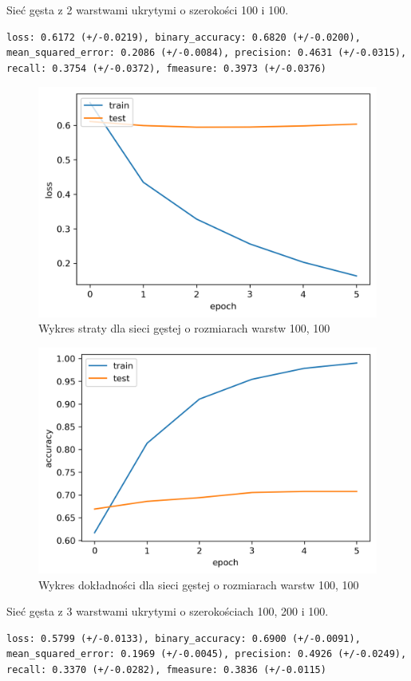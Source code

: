 \documentclass[polish,12pt]{aghthesis}
\begin{document}
Sieć gęsta z 2 warstwami ukrytymi o szerokości 100 i 100.

\begin{lstlisting}[float=h!, style=result, caption={Wyniki sieci gęstej o rozmiarach warstw 100, 100}]
loss: 0.6172 (+/-0.0219), binary_accuracy: 0.6820 (+/-0.0200), mean_squared_error: 0.2086 (+/-0.0084), precision: 0.4631 (+/-0.0315), recall: 0.3754 (+/-0.0372), fmeasure: 0.3973 (+/-0.0376)
\end{lstlisting}

\begin{figure}[H]
	\centering
	\includegraphics[width=0.7\linewidth]{dense_100_100_loss.png}
	\caption{Wykres straty dla sieci gęstej o rozmiarach warstw 100, 100}
	\label{fig:dense_100_100_loss}
\end{figure}
\begin{figure}[H]
	\centering
	\includegraphics[width=0.7\linewidth]{dense_100_100_acc.png}
	\caption{Wykres dokładności dla sieci gęstej o rozmiarach warstw 100, 100}
	\label{fig:dense_100_100_acc}
\end{figure}

Sieć gęsta z 3 warstwami  ukrytymi o szerokościach 100, 200 i 100.

\begin{lstlisting}[float=h!, style=result, caption={Wyniki sieci gęstej o rozmiarach warstw 100, 200, 100}]
loss: 0.5799 (+/-0.0133), binary_accuracy: 0.6900 (+/-0.0091), mean_squared_error: 0.1969 (+/-0.0045), precision: 0.4926 (+/-0.0249), recall: 0.3370 (+/-0.0282), fmeasure: 0.3836 (+/-0.0115)
\end{lstlisting}
\end{document}

